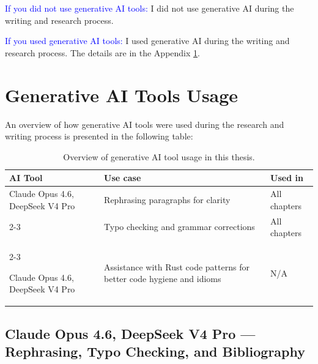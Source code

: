 \documentclass[12pt,a4paper]{book}
\theoremstyle{definition}
\theoremstyle{remark}
\begin{document}
\textcolor{blue}{If you did not use generative AI tools:} I did not use generative AI during the writing and research process.

\textcolor{blue}{If you used generative AI tools:} I used generative AI during the writing and research process. The details are in the Appendix \ref{genAIUsage}.




\newpage
\normalsize{}

\tableofcontents














\appendix






\chapter{Generative AI Tools Usage}
\label{genAIUsage}


An overview of how generative AI tools were used during the research and writing process is presented in the following table:

\begin{table}[h!]
    \centering
    \begin{tabularx}{\textwidth}{|p{4.2cm}|X|l|}
            \hline \rowcolor{blue!20}
         AI Tool & Use case & Used in \\\hline
         Claude Opus 4.6, DeepSeek V4 Pro 
            & Rephrasing paragraphs for clarity 
            & All chapters  \\\cline{2-3}
          
            & Typo checking and grammar corrections 
            & All chapters \\\cline{2-3}
          
         Claude Opus 4.6, DeepSeek V4 Pro  
            & Assistance with Rust code patterns for better code hygiene and idioms 
            & N/A  \\\hline

    \end{tabularx}
    \caption{Overview of generative AI tool usage in this thesis.}
    \label{tab:genAIOverview}
\end{table}

\section{Claude Opus 4.6, DeepSeek V4 Pro --- Rephrasing, Typo Checking, and Bibliography}
\end{document}
